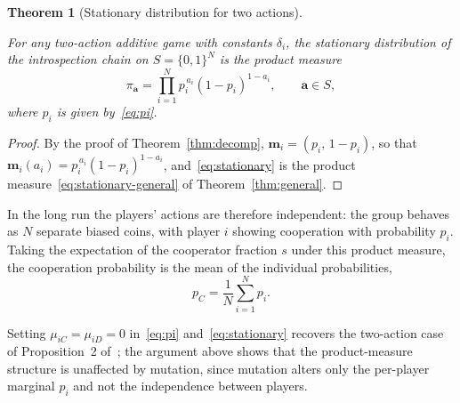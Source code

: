 \documentclass[11pt]{article}
\newtheorem{theorem}{Theorem}
\newcommand{\bfa}{\mathbf{a}}
\newcommand{\bfm}{\mathbf{m}}
\newcommand{\pC}{p_C}
\begin{document}
\begin{theorem}[Stationary distribution for two actions]\label{thm:stationary}

For any two-action additive game with constants \(\delta_i\), the stationary
distribution of the introspection chain on \(S=\{0,1\}^N\) is the product measure
\begin{equation}\label{eq:stationary}
  \pi_{\bfa} = \prod_{i=1}^{N} p_i^{\,a_i}(1-p_i)^{1-a_i}, \qquad \bfa\in S,
\end{equation}
where \(p_i\) is given by~\eqref{eq:pi}.

\end{theorem}

\begin{proof}

By the proof of Theorem~\ref{thm:decomp}, \(\bfm_i=(p_i,\,1-p_i)\), so that
\(\bfm_i(a_i)=p_i^{\,a_i}(1-p_i)^{1-a_i}\), and~\eqref{eq:stationary} is the
product measure~\eqref{eq:stationary-general} of Theorem~\ref{thm:general}.

\end{proof}

In the long run the players' actions are therefore independent: the group behaves as
\(N\) separate biased coins, with player \(i\) showing cooperation with probability
\(p_i\). Taking the expectation of the cooperator fraction \(s\) under this product
measure, the cooperation probability is the mean of the individual probabilities,
\begin{equation}\label{eq:pC-mean}
  \pC = \frac{1}{N}\sum_{i=1}^{N} p_i.
\end{equation}

Setting \(\mu_{iC}=\mu_{iD}=0\) in~\eqref{eq:pi} and~\eqref{eq:stationary}
recovers the two-action
case of Proposition~2 of~\cite{couto2023multiplayer}; the argument above shows
that the product-measure structure is unaffected by mutation, since mutation
alters only the per-player marginal \(p_i\) and not the independence between
players.
\end{document}
